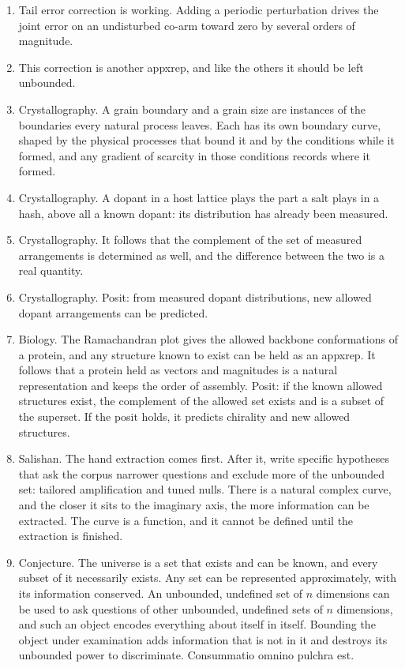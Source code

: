 \begin{enumerate}
\item Tail error correction is working. Adding a periodic perturbation drives the joint error on an
undisturbed co-arm toward zero by several orders of magnitude.

\item This correction is another appxrep, and like the others it should be left unbounded.

\item Crystallography. A grain boundary and a grain size are instances of the boundaries every natural
process leaves. Each has its own boundary curve, shaped by the physical processes that bound it and by
the conditions while it formed, and any gradient of scarcity in those conditions records where it
formed.

\item Crystallography. A dopant in a host lattice plays the part a salt plays in a hash, above all a
known dopant: its distribution has already been measured.

\item Crystallography. It follows that the complement of the set of measured arrangements is
determined as well, and the difference between the two is a real quantity.

\item Crystallography. Posit: from measured dopant distributions, new allowed dopant arrangements can
be predicted.

\item Biology. The Ramachandran plot gives the allowed backbone conformations of a protein, and any
structure known to exist can be held as an appxrep. It follows that a protein held as vectors and
magnitudes is a natural representation and keeps the order of assembly. Posit: if the known allowed
structures exist, the complement of the allowed set exists and is a subset of the superset. If the
posit holds, it predicts chirality and new allowed structures.

\item Salishan. The hand extraction comes first. After it, write specific hypotheses that ask the
corpus narrower questions and exclude more of the unbounded set: tailored amplification and tuned
nulls. There is a natural complex curve, and the closer it sits to the imaginary axis, the more
information can be extracted. The curve is a function, and it cannot be defined until the extraction is
finished.

\item Conjecture. The universe is a set that exists and can be known, and every subset of it
necessarily exists. Any set can be represented approximately, with its information conserved. An
unbounded, undefined set of $n$ dimensions can be used to ask questions of other unbounded, undefined
sets of $n$ dimensions, and such an object encodes everything about itself in itself. Bounding the
object under examination adds information that is not in it and destroys its unbounded power to
discriminate. Consummatio omnino pulchra est.


\end{enumerate}
